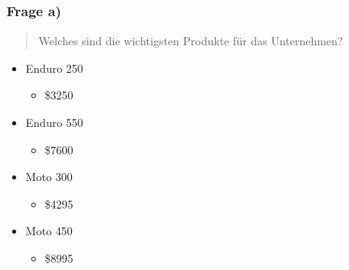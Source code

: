 \documentclass{beamer}
\begin{document}
\begin{frame}
\frametitle{Frage a)}

\begin{quote}
Welches sind die wichtigsten Produkte für das Unternehmen?
\end{quote}

\begin{itemize}
\setlength{\itemsep}{14pt}

\item Enduro 250
\begin{itemize}
\item \$3250
\end{itemize}

\item Enduro 550
\begin{itemize}
\item \$7600
\end{itemize}

\item Moto 300
\begin{itemize}
\item \$4295
\end{itemize}

\item Moto 450
\begin{itemize}
\item \$8995
\end{itemize}

\end{itemize}

\end{frame}
\end{document}
